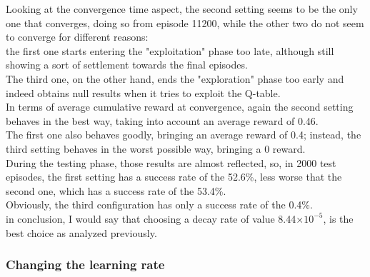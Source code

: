 \documentclass{article}
\begin{document}
\begin{center}
\centering
{}
\end{center}


Looking at the convergence time aspect, the second setting seems to be the only one that converges, doing so from episode 11200, while the other two do not seem to converge for different reasons:
\\
the first one starts entering the "exploitation" phase too late, although still showing a sort of settlement towards the final episodes.
\\
The third one, on the other hand, ends the "exploration" phase too early and indeed obtains null results when it tries to exploit the Q-table.
\\
In terms of average cumulative reward at convergence, again the second setting behaves in the best way, taking into account an average reward of 0.46.
\\
The first one also behaves goodly, bringing an average reward of 0.4; instead, the third setting behaves in the worst possible way, bringing a 0 reward.
\\
During the testing phase, those results are almost reflected, so, in 2000 test episodes, the first setting has a success rate of the 52.6\%, less worse that the second one, which has a success rate of the 53.4\%.
\\
Obviously, the third configuration has only a success rate of the 0.4\%.
\\
in conclusion, I would say that choosing a decay rate of value 8.44$\times10^{-5}$, is the best choice as analyzed previously.

\subsubsection{Changing the learning rate}
\end{document}
